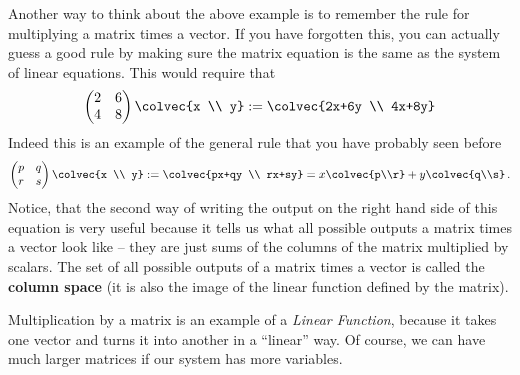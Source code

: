 Another way to think about the above example is to remember the rule for multiplying a matrix times a vector.
\hypertarget{system2matrix}{If} you have forgotten this, you can actually  guess a good rule by making sure the matrix equation is the same as the system of linear equations.
This would require that
$$
 \begin{pmatrix}
      2     & 6 \\
      4     & 8
    \end{pmatrix}
  \colvec{x \\ y}
  :=   \colvec{2x+6y \\ 4x+8y}
$$
Indeed this is an example of
\hypertarget{ch1vecmult}{the general rule} that you have probably seen before
\begin{equation*}\label{2x2multiplication}
    \begin{pmatrix}
      p     & q  \\
      r      & s
    \end{pmatrix}
  \colvec{x \\ y}
  :=
  \colvec{px+qy \\ rx+sy}=x\colvec{p\\r} + y\colvec{q\\s}\, .
\end{equation*}
Notice, that the second way of writing the output on the right hand side of this equation is very useful because it
tells us what all possible outputs a matrix times a vector look like -- they are just sums of the columns of the matrix
multiplied by scalars. The set of all possible outputs of a matrix times a vector is called 
the {\bf column space} (it is also the image of the linear function defined by the matrix).


 


\noindent
Multiplication by 
\hypertarget{earlier}{a matrix} is an example of a \emph{Linear Function}, because it takes one vector and turns it into another in a ``linear'' way.
Of course, we can have much larger matrices if our system has more variables.


